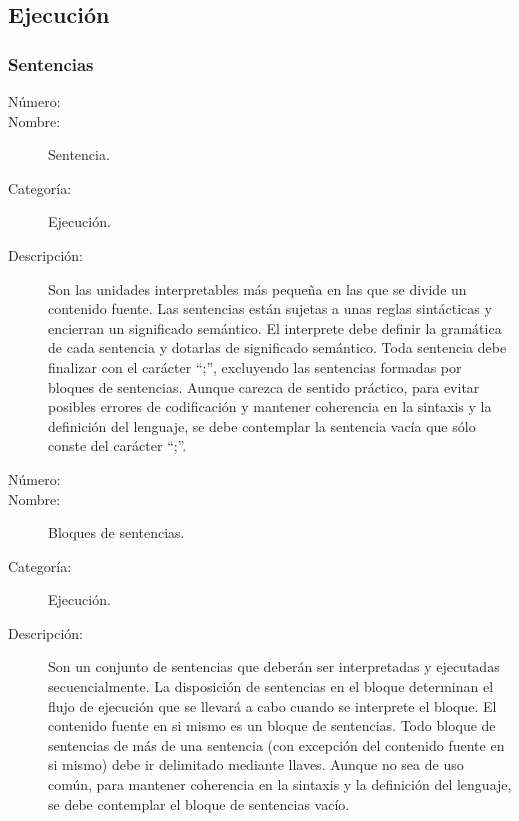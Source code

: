 \subsection{Ejecución}
\subsubsection{Sentencias}
\begin{framed}
	\begin{description}
		\item [Número:] \cn
		\item [Nombre:] Sentencia.
		\item [Categoría:] Ejecución.
		\item [Descripción:] Son las unidades interpretables más pequeña en las que se divide un contenido fuente. Las sentencias están sujetas a
		unas reglas sintácticas y encierran un significado semántico. El interprete debe definir la gramática de cada sentencia y dotarlas de significado
		semántico. Toda sentencia debe finalizar con el carácter ``;'', excluyendo las sentencias formadas por bloques de sentencias. Aunque carezca
		de sentido práctico, para evitar posibles errores de codificación y mantener coherencia en la sintaxis y la definición del lenguaje, se debe
		contemplar la sentencia vacía que sólo conste del carácter ``;''.
	\end {description}
\end{framed}

\begin{framed}
	\begin{description}
		\item [Número:] \cn
		\item [Nombre:] Bloques de sentencias.
		\item [Categoría:] Ejecución.
		\item [Descripción:] Son un conjunto de sentencias que deberán ser interpretadas y ejecutadas secuencialmente. La disposición de
		sentencias en el bloque determinan el flujo de ejecución que se llevará a cabo cuando se interprete el bloque. El contenido fuente
		en si mismo es un bloque de sentencias. Todo bloque de sentencias de más de una sentencia (con excepción del contenido fuente en si mismo)
		debe ir delimitado mediante llaves. Aunque no sea de uso común, para mantener coherencia en la sintaxis y la definición del lenguaje, se debe
		contemplar el bloque de sentencias vacío.
	\end {description}
\end{framed}

